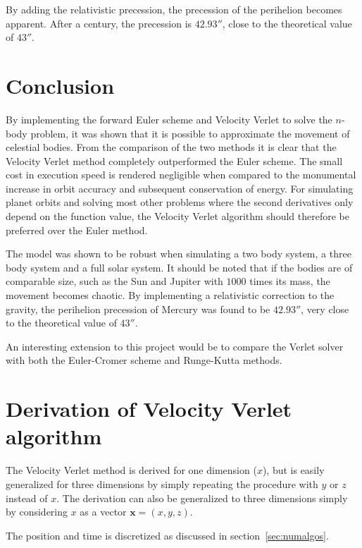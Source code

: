 \documentclass[aps,reprint]{revtex4-1}
\newcommand\blankpage{%
  \null
  \thispagestyle{empty}%
  \addtocounter{page}{-1}%
  \newpage}
\begin{document}
By adding the relativistic precession, the precession of the perihelion becomes
apparent. After a century, the precession is \(42.93''\), close to the theoretical
value of \(43''\).

\section{Conclusion}
\label{sec:conclusion}
By implementing the forward Euler scheme and Velocity Verlet to solve the
\(n\)-body problem, it was shown that it is possible to approximate the movement
of celestial bodies. From the comparison of the two methods it is clear that the
Velocity Verlet method completely outperformed the Euler scheme. The small
cost in execution speed is rendered negligible when compared to the monumental
increase in orbit accuracy and subsequent conservation of energy. For simulating planet
orbits and solving most other problems where the second derivatives only depend
on the function value, the Velocity Verlet algorithm should therefore be
preferred over the Euler method.

The model was shown to be robust when simulating a two body system, a three body
system and a full solar system. It should be noted that if the bodies are of
comparable size, such as the Sun and Jupiter with \(1000\) times its mass, the
movement becomes chaotic. By implementing a relativistic correction to the
gravity, the perihelion precession of Mercury was found to be \(42.93''\), very
close to the theoretical value of \(43''\).

An interesting extension to this project would be to compare the Verlet solver
with both the Euler-Cromer scheme and Runge-Kutta methods.

\blankpage
\appendix
\section{Derivation of Velocity Verlet algorithm}
\label{sec:velocityverlet}
The Velocity Verlet method is derived for one dimension ($x$), but is easily
generalized for three dimensions by simply repeating the procedure with $y$
or $z$ instead of $x$. The derivation can also be generalized to three dimensions
simply by considering $x$ as a vector $\mathbf{x} = (x, y, z)$.

The position and time is discretized as discussed in section~\ref{sec:numalgos}.
\end{document}
